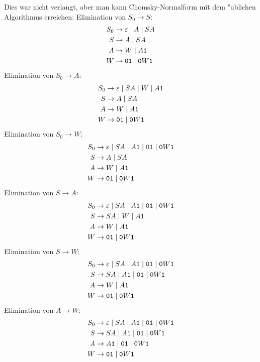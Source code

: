 {\begin{loesung}
Dies war nicht verlangt, aber man kann Chomsky-Normalform mit dem
"ublichen Algorithmus erreichen: Elimination von $S_0\to S$:
\begin{align*}
S_0&\to \varepsilon\;|\;A\;|\;SA\\
S  &\to A\;|\;SA\\
A  &\to W\;|\;A{\tt 1}\\
W  &\to {\tt 01}\;|\; {\tt 0}W{\tt 1}
\end{align*}
Elimination von $S_0\to A$:
\begin{align*}
S_0&\to \varepsilon\;|\;SA\;|\;W\;|\;A{\tt 1}\\
S  &\to A\;|\;SA\\
A  &\to W\;|\;A{\tt 1}\\
W  &\to {\tt 01}\;|\; {\tt 0}W{\tt 1}
\end{align*}
Elimination von $S_0\to W$:
\begin{align*}
S_0&\to \varepsilon\;|\;SA\;|\;A{\tt 1}\;|\;{\tt 01}\;|\;{\tt 0}W{\tt 1}\\
S  &\to A\;|\;SA\\
A  &\to W\;|\;A{\tt 1}\\
W  &\to {\tt 01}\;|\; {\tt 0}W{\tt 1}
\end{align*}
Elimination von $S\to A$:
\begin{align*}
S_0&\to \varepsilon\;|\;SA\;|\;A{\tt 1}\;|\;{\tt 01}\;|\;{\tt 0}W{\tt 1}\\
S  &\to SA\;|\;W\;|\;A{\tt 1}\\
A  &\to W\;|\;A{\tt 1}\\
W  &\to {\tt 01}\;|\; {\tt 0}W{\tt 1}
\end{align*}
Elimination von $S\to W$:
\begin{align*}
S_0&\to \varepsilon\;|\;SA\;|\;A{\tt 1}\;|\;{\tt 01}\;|\;{\tt 0}W{\tt 1}\\
S  &\to SA\;|\;A{\tt 1}\;|\;{\tt 01}\;|\;{\tt 0}W{\tt 1}\\
A  &\to W\;|\;A{\tt 1}\\
W  &\to {\tt 01}\;|\; {\tt 0}W{\tt 1}
\end{align*}
Elimination von $A\to W$:
\begin{align*}
S_0&\to \varepsilon\;|\;SA\;|\;A{\tt 1}\;|\;{\tt 01}\;|\;{\tt 0}W{\tt 1}\\
S  &\to SA\;|\;A{\tt 1}\;|\;{\tt 01}\;|\;{\tt 0}W{\tt 1}\\
A  &\to A{\tt 1}\;|\;{\tt 01}\;|\;{\tt 0}W{\tt 1}\\
W  &\to {\tt 01}\;|\; {\tt 0}W{\tt 1}
\end{align*}

\end{loesung}}
